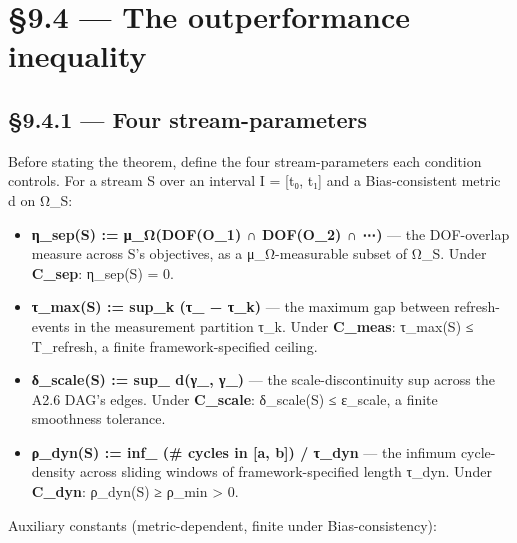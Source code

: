 \documentclass[11pt, openany]{book}
\newcommand{\sectionbreak}{\clearpage}
\begin{document}
\sectionbreak

\section{§9.4 --- The outperformance inequality}

\subsection{§9.4.1 --- Four stream-parameters}

Before stating the theorem, define the four stream-parameters each condition controls. For a stream S over an interval I = [t₀, t₁] and a Bias-consistent metric d on Ω\_\allowbreak{}S:

\begin{itemize}
\item \textbf{η\_\allowbreak{}sep(S) := μ\_\allowbreak{}Ω(DOF(O\_\allowbreak{}1) ∩ DOF(O\_\allowbreak{}2) ∩ ⋯)} --- the DOF-overlap measure across S's objectives, as a μ\_\allowbreak{}Ω-measurable subset of Ω\_\allowbreak{}S. Under \textbf{C\_\allowbreak{}sep}: η\_\allowbreak{}sep(S) = 0.
\item \textbf{τ\_\allowbreak{}max(S) := sup\_\allowbreak{}k (τ\_ − τ\_\allowbreak{}k)} --- the maximum gap between refresh-events in the measurement partition {τ\_\allowbreak{}k}. Under \textbf{C\_\allowbreak{}meas}: τ\_\allowbreak{}max(S) ≤ T\_\allowbreak{}refresh, a finite framework-specified ceiling.
\item \textbf{δ\_\allowbreak{}scale(S) := sup\_ d(γ\_, γ\_)} --- the scale-discontinuity sup across the A2.6 DAG's edges. Under \textbf{C\_\allowbreak{}scale}: δ\_\allowbreak{}scale(S) ≤ ε\_\allowbreak{}scale, a finite smoothness tolerance.
\item \textbf{ρ\_\allowbreak{}dyn(S) := inf\_ (\# cycles in [a, b]) / τ\_\allowbreak{}dyn} --- the infimum cycle-density across sliding windows of framework-specified length τ\_\allowbreak{}dyn. Under \textbf{C\_\allowbreak{}dyn}: ρ\_\allowbreak{}dyn(S) ≥ ρ\_\allowbreak{}min > 0.
\end{itemize}

Auxiliary constants (metric-dependent, finite under Bias-consistency):
\end{document}
